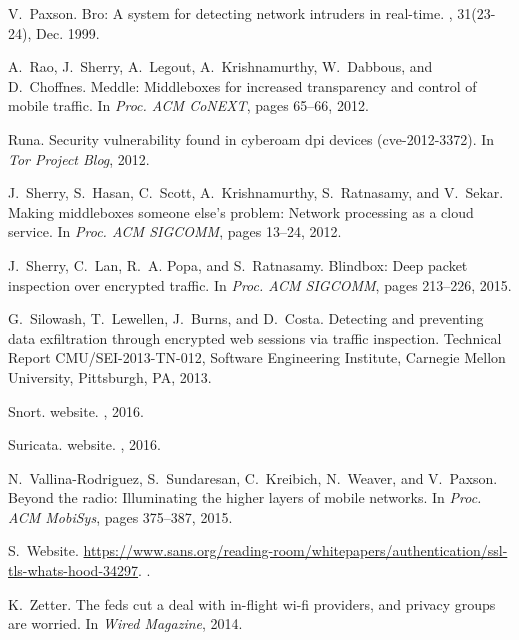 \documentclass{sig-alternate-10pt}
\begin{document}
{\begin{thebibliography}{10}
V.~Paxson.
\newblock Bro: A system for detecting network intruders in real-time.
, 31(23-24), Dec. 1999.

A.~Rao, J.~Sherry, A.~Legout, A.~Krishnamurthy, W.~Dabbous, and D.~Choffnes.
\newblock Meddle: Middleboxes for increased transparency and control of mobile
  traffic.
\newblock In {\em Proc. ACM CoNEXT}, pages 65--66, 2012.

\newpage

Runa.
\newblock Security vulnerability found in cyberoam dpi devices (cve-2012-3372).
\newblock In {\em Tor Project Blog}, 2012.

J.~Sherry, S.~Hasan, C.~Scott, A.~Krishnamurthy, S.~Ratnasamy, and V.~Sekar.
\newblock Making middleboxes someone else's problem: Network processing as a
  cloud service.
\newblock In {\em Proc. ACM SIGCOMM}, pages 13--24, 2012.

J.~Sherry, C.~Lan, R.~A. Popa, and S.~Ratnasamy.
\newblock Blindbox: Deep packet inspection over encrypted traffic.
\newblock In {\em Proc. ACM SIGCOMM}, pages 213--226, 2015.

G.~Silowash, T.~Lewellen, J.~Burns, and D.~Costa.
\newblock Detecting and preventing data exfiltration through encrypted web
  sessions via traffic inspection.
\newblock Technical Report CMU/SEI-2013-TN-012, Software Engineering Institute,
  Carnegie Mellon University, Pittsburgh, PA, 2013.

Snort.
\newblock website.
, 2016.

Suricata.
\newblock website.
, 2016.

N.~Vallina-Rodriguez, S.~Sundaresan, C.~Kreibich, N.~Weaver, and V.~Paxson.
\newblock Beyond the radio: Illuminating the higher layers of mobile networks.
\newblock In {\em Proc. ACM MobiSys}, pages 375--387, 2015.

S.~Website.
\newblock
  \url{https://www.sans.org/reading-room/whitepapers/authentication/ssl-tls-whats-hood-34297}.
.

K.~Zetter.
\newblock The feds cut a deal with in-flight wi-fi providers, and privacy
  groups are worried.
\newblock In {\em Wired Magazine}, 2014.

\end{thebibliography}

}
\end{document}
